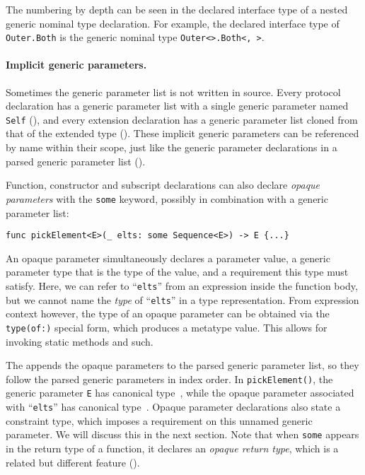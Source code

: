 \documentclass[../generics]{subfiles}
\begin{document}
The numbering by depth can be seen in the declared interface type of a nested generic nominal type declaration. For example, the declared interface type of \texttt{Outer.Both} is the generic nominal type \texttt{Outer<>.Both<, >}.

\paragraph{Implicit generic parameters.} Sometimes the generic parameter list is not written in source. Every protocol declaration has a generic parameter list with a single generic parameter named \texttt{Self} (), and every extension declaration has a generic parameter list cloned from that of the extended type (). These implicit generic parameters can be referenced by name within their scope, just like the generic parameter declarations in a parsed generic parameter list ().

Function, constructor and subscript declarations can also declare \emph{opaque parameters} with the \texttt{some} keyword, possibly in combination with a generic parameter list:
\begin{Verbatim}
func pickElement<E>(_ elts: some Sequence<E>) -> E {...}
\end{Verbatim}
An opaque parameter simultaneously declares a parameter value, a generic parameter type that is the type of the value, and a requirement this type must satisfy. Here, we can refer to ``\texttt{elts}'' from an expression inside the function body, but we cannot name the \emph{type} of ``\texttt{elts}'' in a type representation. From expression context however, the type of an opaque parameter can be obtained via the \texttt{type(of:)} special form, which produces a metatype value. This allows for invoking static methods and such.

The  appends the opaque parameters to the parsed generic parameter list, so they follow the parsed generic parameters in index order. In \texttt{pickElement()}, the generic parameter \texttt{E} has canonical type~\rT, while the opaque parameter associated with ``\texttt{elts}'' has canonical type~\rU. Opaque parameter declarations also state a constraint type, which imposes a requirement on this unnamed generic parameter. We will discuss this in the next section. Note that when \texttt{some} appears in the return type of a function, it declares an \emph{opaque return type}, which is a related but different feature ().
\end{document}
